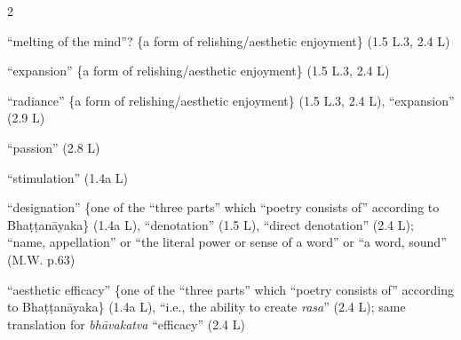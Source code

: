 \documentclass[10pt]{article}
\begin{document}
\begin{multicols}{2}
\begin{enumerate}[
			leftmargin=0em,
			rightmargin=0em,
		]
		 ``melting of the mind''? \{a form of relishing/aesthetic enjoyment\} (1.5 L.3, 2.4 L)

		 ``expansion'' \{a form of relishing/aesthetic enjoyment\} (1.5 L.3, 2.4 L)

		 ``radiance'' \{a form of relishing/aesthetic enjoyment\} (1.5 L.3, 2.4 L),
		``expansion'' (2.9 L)




		 ``passion'' (2.8 L) %

		 ``stimulation'' (1.4a L)

		 ``designation'' \{one of the ``three parts'' which ``poetry consists of'' according to Bhaṭṭanāyaka\} (1.4a L),
		``denotation'' (1.5 L),
		``direct denotation'' (2.4 L); %
		``name, appellation'' or
		``the literal power or sense of a word'' or
		``a word, sound'' (M.W. p.63)

		 ``aesthetic efficacy'' \{one of the ``three parts'' which ``poetry consists of'' according to Bhaṭṭanāyaka\} (1.4a L),
		``i.e., the ability to create \textit{rasa}'' (2.4 L);
		same translation for \textit{bhāvakatva} ``efficacy'' (2.4 L) %


\end{enumerate}
\end{multicols}
\end{document}
